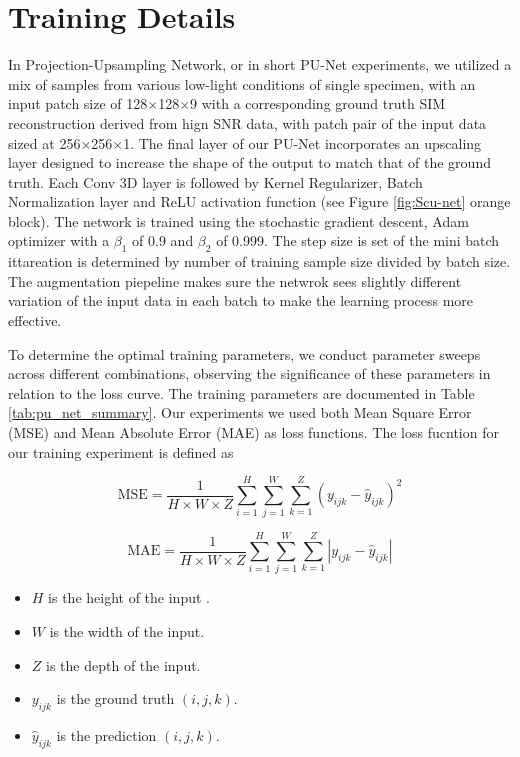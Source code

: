 \documentclass[11pt,
  paper=a4, 
  bibliography=totocnumbered,
	captions=tableheading,
	BCOR=10mm
]{scrreprt}
\theoremstyle{definition}
\newcommand{\figureref}[1]{Figure \ref{#1}}
\newcommand{\tableref}[1]{Table \ref{#1}}
\begin{document}
\section{Training Details}
In Projection-Upsampling Network, or in short PU-Net experiments, we utilized a mix of samples from  various low-light conditions of single specimen, with an input patch size of 
128×128×9  with a corresponding ground truth SIM reconstruction derived from hign SNR data, with patch pair of the input data sized at 
256×256×1. The final layer of our PU-Net incorporates an upscaling layer designed to increase the shape of the output to match that of the ground truth. Each Conv 3D layer is followed by Kernel Regularizer, Batch Normalization layer and ReLU activation function (see  \figureref{fig:Scu-net} orange block).	
The network is trained using the stochastic gradient descent, Adam optimizer with a $\beta_1$ of 0.9 and $\beta_2$ of 0.999. The step size is set of the mini batch ittareation is determined by number of training sample size divided by batch size. 
The augmentation piepeline makes sure the netwrok sees slightly different variation of the input data in each batch to make the learning process more effective. 

\vspace{1cm}
\noindent
To determine the optimal training parameters, we conduct parameter sweeps across different combinations, observing the significance of these parameters in relation to the loss curve. 
The training parameters are documented in \tableref{tab:pu_net_summary}. Our experiments we used both Mean Square Error (MSE) and Mean Absolute Error (MAE) as loss functions. The loss fucntion for our training experiment is defined as 






\begin{equation}\label{eq:MSE}
\text{MSE} = \frac{1}{H \times W \times Z} \sum_{i=1}^{H} \sum_{j=1}^{W} \sum_{k=1}^{Z} \left(y_{ijk} - \hat{y}_{ijk}\right)^2
\end{equation}

\vspace{1cm}

\begin{equation}\label{eq:MAE}
\text{MAE} = \frac{1}{H \times W \times Z} \sum_{i=1}^{H} \sum_{j=1}^{W} \sum_{k=1}^{Z} \left| y_{ijk} - \hat{y}_{ijk} \right|
\end{equation}

\begin{itemize}
    \item \(H \) is the height of the input .
    \item \(W \) is the width of the input.
    \item \(Z \) is the depth of the input.
    \item \(y_{ijk}\) is the ground truth  \((i,j,k)\).
    \item \(\hat{y}_{ijk}\) is the prediction  \((i,j,k)\).
\end{itemize}
\end{document}
